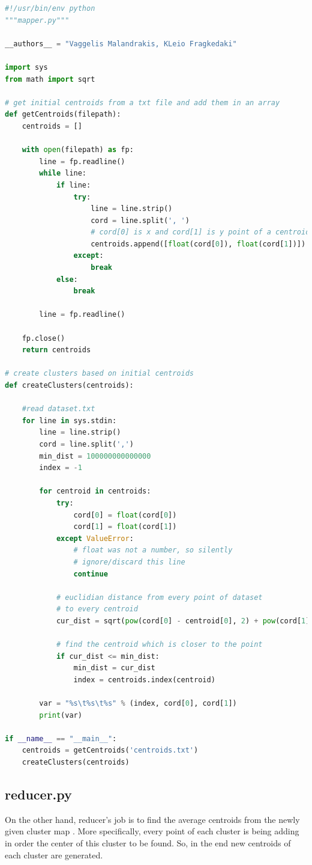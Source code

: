 \begin{lstlisting}[language=Python]
#!/usr/bin/env python
"""mapper.py"""

__authors__ = "Vaggelis Malandrakis, KLeio Fragkedaki"

import sys
from math import sqrt

# get initial centroids from a txt file and add them in an array
def getCentroids(filepath):
	centroids = []
	
	with open(filepath) as fp:
		line = fp.readline()
		while line:
			if line:
				try:
					line = line.strip()
					cord = line.split(', ')
					# cord[0] is x and cord[1] is y point of a centroid
					centroids.append([float(cord[0]), float(cord[1])])
				except:
					break
			else:
				break
	
		line = fp.readline()
	
	fp.close()
	return centroids
	
# create clusters based on initial centroids
def createClusters(centroids):

	#read dataset.txt
	for line in sys.stdin:
		line = line.strip()
		cord = line.split(',')
		min_dist = 100000000000000
		index = -1
		
		for centroid in centroids:
			try:
				cord[0] = float(cord[0])
				cord[1] = float(cord[1])
			except ValueError:
				# float was not a number, so silently
				# ignore/discard this line
				continue
			
			# euclidian distance from every point of dataset
			# to every centroid
			cur_dist = sqrt(pow(cord[0] - centroid[0], 2) + pow(cord[1] - centroid[1], 2))
			
			# find the centroid which is closer to the point
			if cur_dist <= min_dist:
				min_dist = cur_dist
				index = centroids.index(centroid)
	
		var = "%s\t%s\t%s" % (index, cord[0], cord[1])
		print(var)

if __name__ == "__main__":
	centroids = getCentroids('centroids.txt')
	createClusters(centroids)
\end{lstlisting}

\subsection{reducer.py}
 On the other hand, reducer's job is to find the average centroids from the newly given cluster map . More specifically, every point of each cluster is being adding in order the center of this cluster to be found. So, in the end new centroids of each cluster are generated.
 
